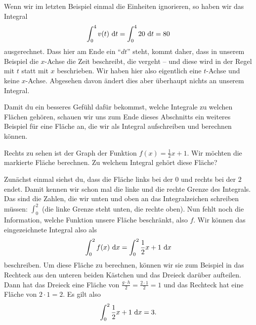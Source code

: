 \documentclass[../../main.tex]{subfiles}
\begin{document}
\begin{example}{}
    Wenn wir im letzten Beispiel einmal die Einheiten ignorieren, so haben wir das Integral
    \[\int_0^4v(t)\mathop{}\mathrm{d} t=\int_0^420\mathop{}\mathrm{d} t=80\]
    ausgerechnet. Dass hier am Ende ein \enquote{$dt$} steht, kommt daher, dass in unserem Beispiel die $x$-Achse die
    Zeit beschreibt, die vergeht -- und diese wird in der Regel mit $t$ statt mit $x$ beschrieben. Wir haben hier also
    eigentlich eine $t$-Achse und keine $x$-Achse. Abgesehen davon
    ändert dies aber überhaupt nichts an unserem Integral.
\end{example}

Damit du ein besseres Gefühl dafür bekommst, welche Integrale zu welchen Flächen gehören, schauen wir uns zum Ende dieses
Abschnitts ein weiteres Beispiel für eine Fläche an, die wir als Integral aufschreiben und berechnen können.
\begin{example}{}
    Rechts zu sehen ist der Graph der Funktion $f(x)=\frac{1}{2}x+1$. Wir möchten die markierte Fläche berechnen. Zu
    welchem Integral gehört diese Fläche?

    Zunächst einmal siehst du, dass die Fläche links bei der $0$ und rechts bei der $2$ endet. Damit kennen wir schon
    mal die linke und die rechte Grenze des Integrals. Das sind die Zahlen, die wir unten und oben an das Integralzeichen
    schreiben müssen: $\displaystyle \int_0^2$ (die linke Grenze steht unten, die rechte oben). Nun fehlt noch die Information,
    welche Funktion unsere Fläche beschränkt, also $f$. Wir können das eingezeichnete Integral also als
    \[\int_0^2f(x)\mathop{}\mathrm{d} x=\int_0^2\frac{1}{2}x+1\mathop{}\mathrm{d} x\]
    beschreiben. Um diese Fläche zu berechnen, können wir sie zum Beispiel in das Rechteck aus den unteren beiden 
    Kästchen und das Dreieck darüber aufteilen. Dann hat das Dreieck eine Fläche von 
    $\frac{g\cdot h}{2}=\frac{2\cdot 1}{2}=1$ und das Rechteck hat eine Fläche von $2\cdot 1=2$. Es gilt also
    \[\int_0^2\frac{1}{2}x+1\mathop{}\mathrm{d} x=3.\]
\end{example}
\end{document}

